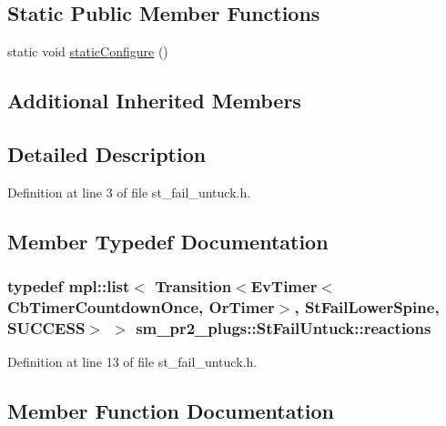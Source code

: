 \subsection*{Static Public Member Functions}
\begin{DoxyCompactItemize}
\item 
static void \hyperlink{structsm__pr2__plugs_1_1StFailUntuck_abd604f84f00dc9f4e8f9ffaae1f1340b}{static\+Configure} ()
\end{DoxyCompactItemize}
\subsection*{Additional Inherited Members}


\subsection{Detailed Description}


Definition at line 3 of file st\+\_\+fail\+\_\+untuck.\+h.



\subsection{Member Typedef Documentation}
\subsubsection[{\texorpdfstring{reactions}{reactions}}]{\setlength{\rightskip}{0pt plus 5cm}typedef mpl\+::list$<$ Transition$<$Ev\+Timer$<$Cb\+Timer\+Countdown\+Once, {\bf Or\+Timer}$>$, {\bf St\+Fail\+Lower\+Spine}, {\bf S\+U\+C\+C\+E\+SS}$>$ $>$ {\bf sm\+\_\+pr2\+\_\+plugs\+::\+St\+Fail\+Untuck\+::reactions}}\hypertarget{structsm__pr2__plugs_1_1StFailUntuck_a0bdd7212772e86a51482f6b7cd162866}{}\label{structsm__pr2__plugs_1_1StFailUntuck_a0bdd7212772e86a51482f6b7cd162866}


Definition at line 13 of file st\+\_\+fail\+\_\+untuck.\+h.



\subsection{Member Function Documentation}
